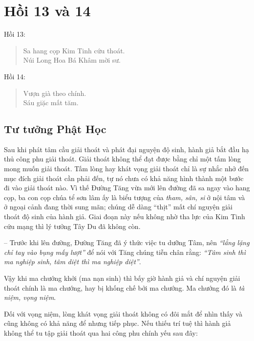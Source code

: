 \chapter{Hồi 13 và 14} %
\label{cha:hoi_13_14}

Hồi 13:

\begin{verse}
\begin{itshape}
Sa hang cọp Kim Tinh cứu thoát.\\
Núi Long Hoa Bá Khâm mời sư.
\end{itshape}
\end{verse}

Hồi 14:

\begin{verse}
\begin{itshape}
Vượn già theo chính.\\
Sáu giặc mất tăm.
\end{itshape}
\end{verse}

\section{Tư tưởng Phật Học} %
\label{sec:13_phat_hoc}

Sau khi phát tâm cầu giải thoát và phát đại nguyện độ sinh, hành giả bắt đầu hạ thủ công phu giải thoát. Giải thoát không thể đạt được bằng chỉ một tấm lòng mong muốn giải thoát. Tấm lòng hay khát vọng giải thoát chỉ là sự nhắc nhở đến mục đích giải thoát cần phải đến, tự nó chưa có khả năng hình thành một bước đi vào giải thoát nào. Vì thế Đường Tăng vừa mới lên đường đã sa ngay vào hang cọp, ba con cọp chúa tể sơn lâm ấy là biểu tượng của \emph{tham, sân, si} ở nội tâm và ở ngoại cảnh đang thời sung mãn; chúng dễ dàng ``thịt'' mất chí nguyện giải thoát độ sinh của hành giả. Giai đoạn này nếu không nhờ tha lực của Kim Tinh cứu mạng thì lý tưởng Tây Du đã không còn.

-- Trước khi lên đường, Đường Tăng đã ý thức việc tu dưỡng Tâm, nên \emph{``lẳng lặng chỉ tay vào bụng mấy lượt''} để nói với Tăng chúng tiễn chân rằng: \emph{``Tâm sinh thì ma nghiệp sinh, tâm diệt thì ma nghiệp diệt''}.

Vậy khi ma chướng khởi (ma nạn sinh) thì bấy giờ hành giả và chí nguyện giải thoát chính là ma chướng, hay bị khống chế bởi ma chướng. Ma chướng đó là \emph{tà niệm, vọng niệm}.

Đối với vọng niệm, lòng khát vọng giải thoát không có đôi mắt để nhìn thấy và cũng không có khả năng để nhưng tiếp phục. Nếu thiếu trí tuệ thì hành giả không thể tu tập giải thoát qua hai công phu chính yếu sau đây:

